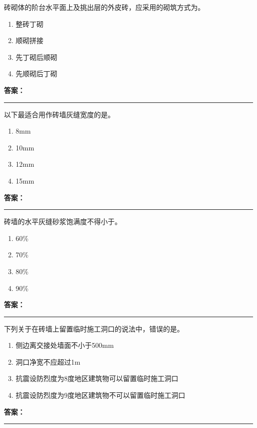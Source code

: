 \documentclass[UTF8,fontset=fandol,11pt]{ctexart}
\newcommand{\answerline}{\textcolor{answerred}{\rule{2.4cm}{0.7pt}}}
\begin{document}
\vspace{0.2em}

\begin{quizbox}[title={第 15 题}]
砖砌体的阶台水平面上及挑出层的外皮砖，应采用的砌筑方式为。\\
\begin{enumerate}[label=\Alph*.]
\item 整砖丁砌
\item 顺砌拼接
\item 先丁砌后顺砌
\item 先顺砌后丁砌
\end{enumerate}
\textbf{\textcolor{answerred}{答案：}} \answerline
\end{quizbox}

\vspace{0.2em}

\begin{quizbox}[title={第 16 题}]
以下最适合用作砖墙灰缝宽度的是。\\
\begin{enumerate}[label=\Alph*.]
\item 8mm
\item 10mm
\item 12mm
\item 15mm
\end{enumerate}
\textbf{\textcolor{answerred}{答案：}} \answerline
\end{quizbox}

\vspace{0.2em}

\begin{quizbox}[title={第 17 题}]
砖墙的水平灰缝砂浆饱满度不得小于。\\
\begin{enumerate}[label=\Alph*.]
\item 60\%
\item 70\%
\item 80\%
\item 90\%
\end{enumerate}
\textbf{\textcolor{answerred}{答案：}} \answerline
\end{quizbox}

\vspace{0.2em}

\begin{quizbox}[title={第 18 题}]
下列关于在砖墙上留置临时施工洞口的说法中，错误的是。\\
\begin{enumerate}[label=\Alph*.]
\item 侧边离交接处墙面不小于500mm
\item 洞口净宽不应超过1m
\item 抗震设防烈度为8度地区建筑物可以留置临时施工洞口
\item 抗震设防烈度为9度地区建筑物不可以留置临时施工洞口
\end{enumerate}
\textbf{\textcolor{answerred}{答案：}} \answerline
\end{quizbox}
\end{document}
